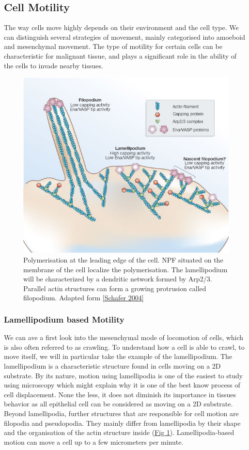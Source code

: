 \documentclass[A4paperpaper,11pt,english]{sphinxmanual}
\begin{document}
\subsection{Cell Motility}
\label{index-latex:cell-motility}
The way cells move highly depends on their environment and the cell type.
We can distinguish several strategies of movement, mainly categorised into
amoeboid and mesenchymal movement. The type of motility for certain
cells can be characteristic for malignant tissue, and plays a significant role in
the ability of the cells to invade nearby tissues.
\begin{figure}[htbp]
\centering
\capstart

\includegraphics[width=0.600\linewidth]{Schafer2004.jpg}
\caption{Polymerisation at the leading edge of the cell. NPF situated on the
membrane of the cell localize the polymerisation. The lamellipodium will be
characterized by a dendritic network formed by Arp2/3. Parallel actin
structures can form a growing protrusion called filopodium.  Adapted form
{\hyperref[index-latex:schafer2004]{{[}Schafer  2004{]}}}}\label{index-latex:fig-schafer}\end{figure}


\subsubsection{Lamellipodium based Motility}
\label{index-latex:lamellipodium-based-motility}
We can ave a first look into the mesenchymal mode of locomotion of cells, which is
also often referred to as crawling. To understand how a cell is able to crawl,
to move itself, we will in particular take the example of the lamellipodium.
The lamellipodium is a characteristic structure found in cells moving on a 2D substrate. By
its nature, motion using lamellipodia is one of the easiest to study using
microscopy which might explain why it is one of the best know process of cell
displacement. None the less, it does not diminish its importance in tissues
behavior as all epithelial cell can be considered as moving on a 2D substrate.
Beyond lamellipodia, further structures that are responsible for cell motion are
filopodia and pseudopodia. They mainly differ from lamellipodia by their shape
and the organisation of the actin structure inside (\hyperref[index-latex:fig-schafer]{Fig  \ref*{index-latex:fig-schafer}}). Lamellipodia-based motion
can move a cell up to a few micrometers per minute.
\end{document}
